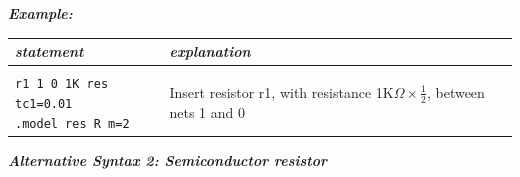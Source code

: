 {\textbf{\textit{Example:}}

\begin{longtable}{l l}
\textit{statement} & \textit{explanation} \\ \hline \\ %
			\parbox{15em}{\texttt{r1 1 0 1K res tc1=0.01}\\ 
			\texttt{.model res R m=2}}
			& \parbox{25em}{{\small Insert resistor r1, with resistance 1K$\Omega \times \frac{1}{2}$, between\\nets 1 and 0}} 
\end{longtable}


\textbf{\textit{Alternative Syntax 2: Semiconductor resistor}}


}
